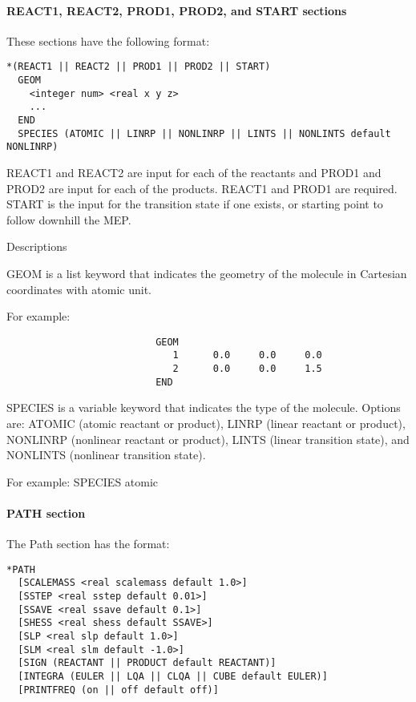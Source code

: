 \paragraph{REACT1, REACT2, PROD1, PROD2, and START sections}

These sections have the following format:
\begin{verbatim}
*(REACT1 || REACT2 || PROD1 || PROD2 || START)
  GEOM
    <integer num> <real x y z>
    ...
  END
  SPECIES (ATOMIC || LINRP || NONLINRP || LINTS || NONLINTS default NONLINRP)
\end{verbatim}

  REACT1 and REACT2 are input for each of the reactants and PROD1 and PROD2
  are input for each of the products.  REACT1 and PROD1 are required.  START
  is the input for the transition state if one exists, or starting point to
  follow downhill the MEP.

  Descriptions

    GEOM is a list keyword that indicates the geometry of the molecule
              in Cartesian coordinates with atomic unit.

              For example:
\begin{verbatim}
                          GEOM
                             1      0.0     0.0     0.0
                             2      0.0     0.0     1.5
                          END 
\end{verbatim}

    SPECIES is a variable keyword that indicates the type of the 
              molecule.  Options are: ATOMIC (atomic reactant or product), 
              LINRP (linear reactant or product), NONLINRP
              (nonlinear reactant or product), LINTS (linear transition 
              state), and NONLINTS (nonlinear transition state).

              For example:
                          SPECIES  atomic

\paragraph{PATH section}

The Path section has the format:

\begin{verbatim}
*PATH
  [SCALEMASS <real scalemass default 1.0>]
  [SSTEP <real sstep default 0.01>]
  [SSAVE <real ssave default 0.1>]
  [SHESS <real shess default SSAVE>]
  [SLP <real slp default 1.0>]
  [SLM <real slm default -1.0>]
  [SIGN (REACTANT || PRODUCT default REACTANT)]
  [INTEGRA (EULER || LQA || CLQA || CUBE default EULER)]
  [PRINTFREQ (on || off default off)]
\end{verbatim}

